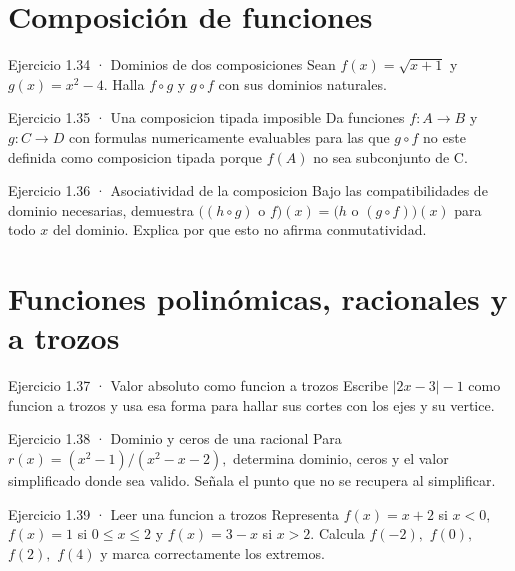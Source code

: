\documentclass[10pt,a4paper,oneside,openany]{book}
\begin{document}
\section{Composición de funciones}
\begin{PSevenExerciseFixed}{Ejercicio 1.34 · Dominios de dos composiciones}
Sean \(f(x)=\sqrt{x+1}\) y \(g(x)=x^{2}-4\). Halla \(f\circ g\) y \(g\circ f\) con sus dominios naturales.
\end{PSevenExerciseFixed}
\begin{PSevenExerciseFixed}{Ejercicio 1.35 · Una composicion tipada imposible}
Da funciones \(f:A\to B\) y \(g:C\to D\) con formulas numericamente evaluables para las que \(g\circ f\) no este definida como composicion tipada porque \(f(A)\) no sea subconjunto de C.
\end{PSevenExerciseFixed}
\begin{PSevenExerciseFixed}{Ejercicio 1.36 · Asociatividad de la composicion}
Bajo las compatibilidades de dominio necesarias, demuestra \(((h\circ g)\) o \(f)(x)=(h\) o \((g\circ f))(x)\) para todo \(x\) del dominio. Explica por que esto no afirma conmutatividad.
\end{PSevenExerciseFixed}
\section{Funciones polinómicas, racionales y a trozos}
\begin{PSevenExerciseFixed}{Ejercicio 1.37 · Valor absoluto como funcion a trozos}
Escribe \(|2x-3|-1\) como funcion a trozos y usa esa forma para hallar sus cortes con los ejes y su vertice.
\end{PSevenExerciseFixed}
\begin{PSevenExerciseFixed}{Ejercicio 1.38 · Dominio y ceros de una racional}
Para \(r(x)=(x^{2}-1)/(x^{2}-x-2),\) determina dominio, ceros y el valor simplificado donde sea valido. Señala el punto que no se recupera al simplificar.
\end{PSevenExerciseFixed}
\begin{PSevenExerciseFixed}{Ejercicio 1.39 · Leer una funcion a trozos}
Representa \(f(x)=x+2\) si \(x<0,\) \(f(x)=1\) si \(0\le x\le 2\) y \(f(x)=3-x\) si \(x>2\). Calcula \(f(-2),\) \(f(0),\) \(f(2),\) \(f(4)\) y marca correctamente los extremos.
\end{PSevenExerciseFixed}
\end{document}
